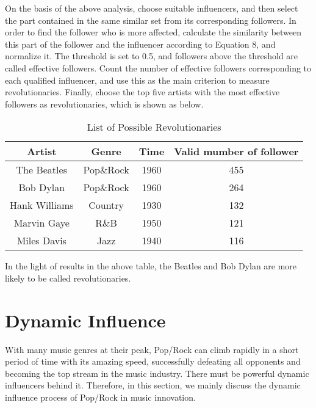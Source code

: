 \documentclass{mcmthesis}
\begin{document}
On the basis of the above analysis, choose suitable influencers, and then select the part contained in the same similar set from its corresponding followers. In order to find the follower who is more affected, calculate the similarity between this part of the follower and the influencer according to Equation 8, and normalize it. The threshold is set to 0.5, and followers above the threshold are called effective followers. Count the number of effective followers corresponding to each qualified influencer, and use this as the main criterion to measure revolutionaries. Finally, choose the top five artists with the most effective followers as revolutionaries, which is shown as below.
\begin{table}[H]
	\centering  
	\caption{List of Possible Revolutionaries}
	
	\label{table_time}
	
	\begin{tabular}{cccc}  
		
		\toprule   
		
		Artist&Genre &Time&Valid mumber of follower \\ 
		\midrule    
		The Beatles&Pop$\&$Rock&1960&455
		\\  
		Bob Dylan&Pop$\&$Rock&1960
		&264
		\\ 
		Hank Williams&Country
		&1930&132\\
		Marvin Gaye&R$\&$B&	1950	&121
		\\      
		Miles Davis	&Jazz&	1940&	116
		\\
		\bottomrule  
		
	\end{tabular}
\end{table}
In the light of results in the above table, the Beatles and Bob Dylan are more likely to be called revolutionaries.

\section{Dynamic Influence}
 With many music genres at their peak, Pop/Rock can climb rapidly in a short period of time with its amazing speed, successfully defeating all opponents and becoming the top stream in the music industry. There must be powerful dynamic influencers behind it. Therefore, in this section, we mainly discuss the dynamic influence process of Pop/Rock in music innovation.
 
\end{document}
